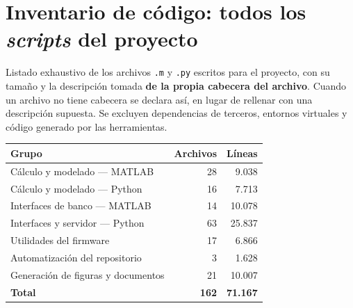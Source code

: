 \section{Inventario de c\'odigo: todos los \emph{scripts} del proyecto}
\label{sec:inventario-scripts}

Listado exhaustivo de los archivos \texttt{.m} y \texttt{.py}
escritos para el proyecto, con su tama\~no y la descripci\'on tomada
\textbf{de la propia cabecera del archivo}. Cuando un archivo no tiene cabecera
se declara as\'i, en lugar de rellenar con una descripci\'on supuesta. Se excluyen
dependencias de terceros, entornos virtuales y c\'odigo generado por las
herramientas.

\begin{center}\footnotesize
\begin{tabular}{@{}l r r@{}}
\toprule
Grupo & Archivos & L\'ineas \\
\midrule
C\'alculo y modelado --- MATLAB & 28 & 9.038 \\
C\'alculo y modelado --- Python & 16 & 7.713 \\
Interfaces de banco --- MATLAB & 14 & 10.078 \\
Interfaces y servidor --- Python & 63 & 25.837 \\
Utilidades del firmware & 17 & 6.866 \\
Automatizaci\'on del repositorio & 3 & 1.628 \\
Generaci\'on de figuras y documentos & 21 & 10.007 \\
\midrule
\textbf{Total} & \textbf{162} & \textbf{71.167} \\
\bottomrule
\end{tabular}
\end{center}

